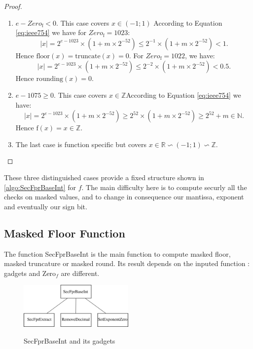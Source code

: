 \documentclass[runningheads]{llncs}
\begin{document}
    \begin{proof}
      \begin{enumerate}
        \item \textbf{$e-Zero_\text{f}<0$}. This case covers $x\in(-1;1)$ According to Equation \ref{eq:ieee754} we have for $Zero_\text{f}=1023$:\begin{equation}\label{eq:zerof1023}|x|=  2^{e-1023} \times (1+m\times 2^{-52})\leq 2^{-1}\times (1+m\times 2^{-52})<1.\end{equation} Hence $\text{floor}(x)=\text{truncate}(x)=0$. For $Zero_\text{f}=1022$, we have: \begin{equation}\label{eq:zerof1022}|x|=  2^{e-1023} \times (1+m\times 2^{-52})\leq 2^{-2}\times (1+m\times 2^{-52})<0.5.\end{equation} Hence $\text{rounding}(x)=0$.
        \item \textbf{$e-1075\geq0$}. This case covers $x\in\mathbb{Z}$According to Equation \ref{eq:ieee754} we have:\begin{equation}\label{eq:1075}|x|= 2^{e-1023} \times (1+m\times 2^{-52})\geq 2^{52}\times (1+m\times 2^{-52})\geq 2^{52} + m \in\mathbb{N}.\end{equation}Hence $\text{f}(x)=x\in\mathbb{Z}$.
        \item The last case is function specific but covers $x\in\mathbb{R}\backsim(-1;1)\backsim\mathbb{Z}$.
      \end{enumerate}
    \end{proof}

    


    These three distinguished cases provide a fixed structure shown in \autoref{algo:SecFprBaseInt} for $f$. The main difficulty here is to compute securly all the checks on masked values, and to change in consequence our mantissa, exponent and eventually our sign bit. 

    \subsection{Masked Floor Function}
    The function SecFprBaseInt is the main function to compute masked floor, masked truncature or masked round. Its result depends on the inputed function : gadgets and Zero$_f$ are different. 
    \begin{figure}[!ht]
        \centering
        \includegraphics[width=0.5\textwidth]{figure/secpfrhierarchie.pdf}
        \label{fig:hierar}
        \caption{SecFprBaseInt and its gadgets}
    \end{figure}
\end{document}
